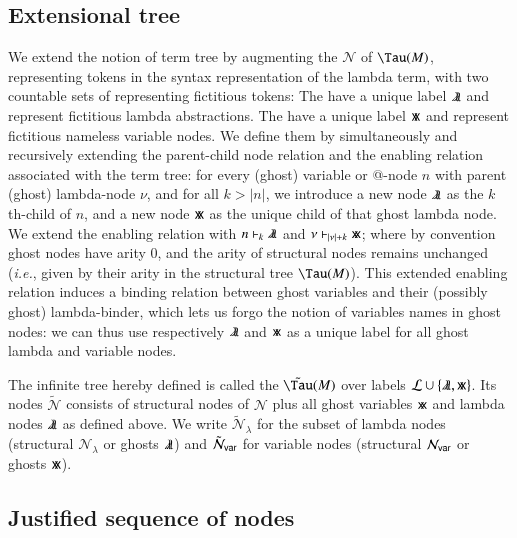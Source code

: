 \documentclass{elsarticle}
\makeatletter
\theoremstyle{plain}
\theoremstyle{definition}
\newcommand\Nodes{\mathcal{N}}%
\newcommand\NodesVar{\Nodes_{\sf var}}%
\newcommand\NodesLmd{\Nodes_\lambda}%
\newcommand{\ghostlmd}{{\lambda\mkern-7mu \lambda}}
\newcommand{\ghostvar}{\mathsf{x\mkern-5mu x}}
\newcommand\ExtendedNodes{\tilde{\Nodes}}
\newcommand\ExtendedNodesVar{\tilde{\Nodes}_{\sf var}}
\newcommand\ExtendedNodesLmd{\tilde{\Nodes}_{\lambda}}
\newcommand{\enables}{\vdash} %
\newcommand{\ctree}{\Tau} %
\newcommand{\exttree}{\tilde{\Tau}} %
\renewcommand\ie{{\it i.e.\@\xspace}}
\makeatother
\begin{document}
\subsection{Extensional tree}
We extend the notion of term tree by augmenting the
  $\Nodes$ of $\ctree(M)$, representing tokens in the syntax representation of the lambda term,
with two countable sets of  representing fictitious tokens: The   have a
 unique label $\ghostlmd$ and represent fictitious lambda abstractions.
The  have a unique label $\ghostvar$ and represent fictitious nameless variable nodes.
%
We define them by simultaneously and recursively
extending the parent-child node relation and the enabling relation
associated with the term tree: for every (ghost) variable or @-node $n$ with parent (ghost) lambda-node $\nu$, and for all $k>|n|$,
we introduce a new node $\ghostlmd$ as the $k$th-child of $n$,
and a new node $\ghostvar$ as the unique child of that ghost lambda node.
We extend the enabling relation with $n \enables_k \ghostlmd$
and $\nu \enables_{|\nu|+ k} \ghostvar$; where by convention ghost nodes have arity $0$, and the arity of structural nodes remains unchanged (\ie, given by their arity in the structural tree $\ctree(M)$).
%
This extended enabling relation induces a binding relation between ghost variables and their (possibly ghost) lambda-binder, which lets us forgo the notion of variables names in ghost nodes: we can thus
use respectively $\ghostlmd$ and $\ghostvar$ as a unique label for all ghost lambda and variable nodes.

The infinite tree hereby defined is called the  $\exttree(M)$ over labels $\mathcal{L} \union \{ \ghostlmd, \ghostvar \}$.
Its nodes $\ExtendedNodes$ consists of structural nodes of $\Nodes$ plus all ghost variables $\ghostvar$ and lambda nodes $\ghostlmd$ as defined above.
We write $\ExtendedNodesLmd$ for the subset of lambda nodes (structural $\NodesLmd$ or ghosts $\ghostlmd$) and $\ExtendedNodesVar$ for variable nodes (structural $\NodesVar$ or ghosts $\ghostvar$).

\subsection{Justified sequence of nodes}
\label{sec:justseq}
\end{document}
